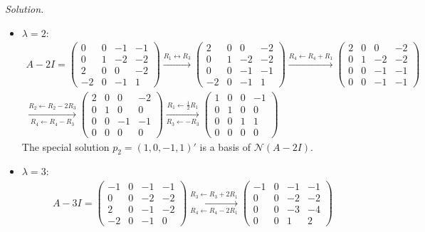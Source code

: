 \documentclass[12pt]{article}
\theoremstyle{definition}
\newenvironment{solution}{\par\noindent\textit{Solution.}\ }{\par\smallskip}
\begin{document}
\begin{solution}
\begin{itemize}
\[\begin{gathered}
\end{gathered}
\]
The special solution \(p_1=(1,1,0,1)'\) is a basis of \(\mathcal N(A-I)\) (Theorem~\ref{thm:r4-four-bases}(c)).
\item \(\lambda=2\):
\[
\begin{gathered}
A-2I=\begin{pmatrix}0&0&-1&-1\\0&1&-2&-2\\2&0&0&-2\\-2&0&-1&1\end{pmatrix}
\xrightarrow{R_1\leftrightarrow R_3}
\begin{pmatrix}2&0&0&-2\\0&1&-2&-2\\0&0&-1&-1\\-2&0&-1&1\end{pmatrix}
\xrightarrow{R_4\leftarrow R_4+R_1}
\begin{pmatrix}2&0&0&-2\\0&1&-2&-2\\0&0&-1&-1\\0&0&-1&-1\end{pmatrix}
\\
\xrightarrow[R_4\leftarrow R_4-R_3]{R_2\leftarrow R_2-2R_3}
\begin{pmatrix}2&0&0&-2\\0&1&0&0\\0&0&-1&-1\\0&0&0&0\end{pmatrix}
\xrightarrow[R_3\leftarrow-R_3]{R_1\leftarrow\frac12R_1}
\begin{pmatrix}1&0&0&-1\\0&1&0&0\\0&0&1&1\\0&0&0&0\end{pmatrix}
\end{gathered}
\]
The special solution \(p_2=(1,0,-1,1)'\) is a basis of \(\mathcal N(A-2I)\).
\item \(\lambda=3\):
\[
\begin{gathered}
A-3I=\begin{pmatrix}-1&0&-1&-1\\0&0&-2&-2\\2&0&-1&-2\\-2&0&-1&0\end{pmatrix}
\xrightarrow[R_4\leftarrow R_4-2R_1]{R_3\leftarrow R_3+2R_1}
\begin{pmatrix}-1&0&-1&-1\\0&0&-2&-2\\0&0&-3&-4\\0&0&1&2\end{pmatrix}

\end{gathered}\]
\end{itemize}
\end{solution}
\end{document}
